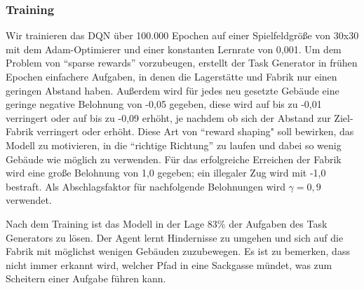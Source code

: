\subsubsection{Training}
Wir trainieren das DQN über 100.000 Epochen auf einer Spielfeldgröße von 30x30 mit dem Adam-Optimierer und einer konstanten Lernrate von 0,001. Um dem Problem von “sparse rewards” vorzubeugen, erstellt der Task Generator in frühen Epochen einfachere Aufgaben, in denen die Lagerstätte und Fabrik nur einen geringen Abstand haben. Außerdem wird für jedes neu gesetzte Gebäude eine geringe negative Belohnung von -0,05 gegeben, diese wird auf bis zu -0,01 verringert oder auf bis zu -0,09 erhöht, je nachdem ob sich der Abstand zur Ziel-Fabrik verringert oder erhöht. Diese Art von “reward shaping" soll bewirken, das Modell zu motivieren, in die “richtige Richtung” zu laufen und dabei so wenig Gebäude wie möglich zu verwenden. Für das erfolgreiche Erreichen der Fabrik wird eine große Belohnung von 1,0 gegeben; ein illegaler Zug wird mit -1,0 bestraft. Als Abschlagsfaktor für nachfolgende Belohnungen wird $\gamma=0,9$ verwendet.

Nach dem Training ist das Modell in der Lage 83\% der Aufgaben des Task Generators zu lösen. Der Agent lernt Hindernisse zu umgehen und sich auf die Fabrik mit möglichst wenigen Gebäuden zuzubewegen. Es ist zu bemerken, dass nicht immer erkannt wird, welcher Pfad in eine Sackgasse mündet, was zum Scheitern einer Aufgabe führen kann.

